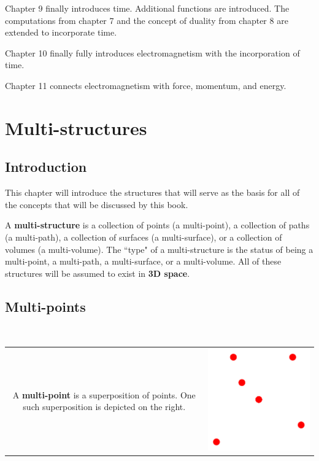 \documentclass{book}
\begin{document}
Chapter 9 finally introduces time. Additional functions are introduced. The computations from chapter 7 and the concept of duality from chapter 8 are extended to incorporate time.

Chapter 10 finally fully introduces electromagnetism with the incorporation of time.  

Chapter 11 connects electromagnetism with force, momentum, and energy. 


\tableofcontents




\mainmatter


\chapter{Multi-structures}\label{chap:multi-structures}

\section{Introduction}

This chapter will introduce the structures that will serve as the basis for all of the concepts that will be discussed by this book. 

A \textbf{multi-structure} is a collection of points (a multi-point), a collection of paths (a multi-path), a collection of surfaces (a multi-surface), or a collection of volumes (a multi-volume). The ``type" of a multi-structure is the status of being a multi-point, a multi-path, a multi-surface, or a multi-volume. All of these structures will be assumed to exist in {\bf 3D space}.


\section{Multi-points}

~

\begin{tabular}{cc}
\parbox{0.5\textwidth}{
A \textbf{multi-point} is a superposition of points. One such superposition is depicted on the right.
} & \parbox{0.5\textwidth}{
\includegraphics[scale = 0.75]{Multi-structures/Multipoints/multi-point_simple}
}
\end{tabular}
\end{document}
